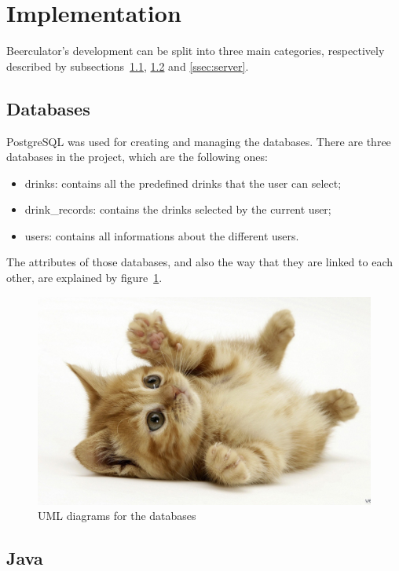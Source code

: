 \section{Implementation}
\label{sec:impl}

Beerculator's development can be split into three main categories, respectively described by {\sc subsections}~\ref{ssec:db}, \ref{ssec:java} and \ref{ssec:server}.

\subsection{Databases}
\label{ssec:db}

PostgreSQL was used for creating and managing the databases. There are three databases in the project, which are the following ones:

\begin{itemize}
\item drinks: contains all the predefined drinks that the user can select;
\item drink\_records: contains the drinks selected by the current user;
\item users: contains all informations about the different users.
\end{itemize}

The attributes of those databases, and also the way that they are linked to each other, are explained by {\sc figure}~\ref{fig:UMLdb}.

\begin{figure}[H]
\centering
   \includegraphics[scale=0.2]{./figures/uml_db.jpeg}
   \caption{UML diagrams for the databases}
   \label{fig:UMLdb}
\end{figure}

\subsection{Java}
\label{ssec:java}

